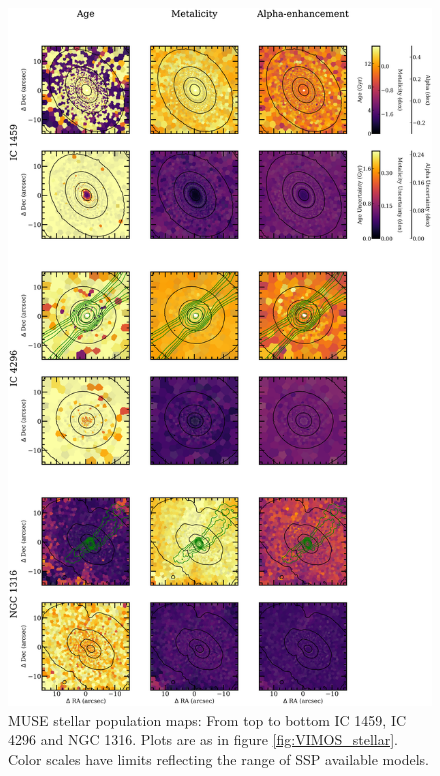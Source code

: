 		\begin{figure}
			\centering
			\includegraphics[height=0.94\textheight]{chapter4/muse/pop1.png}
			\caption[MUSE stellar population maps]{MUSE stellar population maps: From top to bottom IC 1459, IC 4296 and NGC 1316. Plots are as in figure \ref{fig:VIMOS_stellar}. Color scales have limits reflecting the range of SSP available models.}
			\label{fig:MUSE_pop}
		\end{figure}

